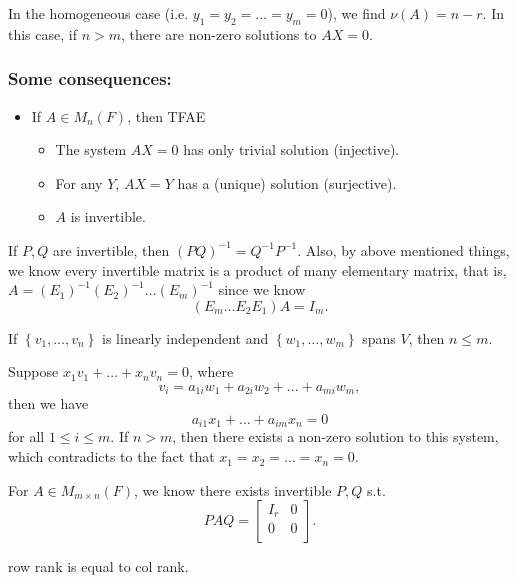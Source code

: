 In the homogeneous case (i.e. \(y_1 = y_2 = \dots = y_m = 0\)), we find \(\nu (A) = n - r\). In this case, if \(n > m\), there are non-zero solutions to \(AX = 0\). 

\subsubsection{Some consequences: }
\begin{itemize}
    \item If \(A \in M_n(F)\), then TFAE 
    \begin{itemize}
        \item The system \(AX=0\) has only trivial solution (injective). 
        \item For any \(Y\), \(AX=Y\) has a (unique) solution (surjective). 
        \item \(A\) is invertible.     
    \end{itemize}
\end{itemize}

If \(P, Q\) are invertible, then \((PQ)^{-1} = Q^{-1} P^{-1}   \). Also, by above mentioned things, we know every invertible matrix is a product of many elementary matrix, that is, \(A = (E_1)^{-1} (E_2)^{-1} \dots (E_m)^{-1}\) since we know 
\[
    (E_m \dots E_2 E_1)A = I_m.
\]   

\begin{prev}
    If \(\left\{ v_1, \dots , v_n \right\} \) is linearly independent and \(\left\{ w_1, \dots , w_m \right\} \) spans \(V\), then \(n \le m\).     
\end{prev}

Suppose \(x_1 v_1 + \dots + x_n v_n = 0\), where 
\[
    v_i = a_{1i}w_1 + a_{2i}w_2 + \dots + a_{mi} w_m,
\] then we have 
\[
    a_{i1} x_1 + \dots + a_{im} x_n = 0
\] for all \(1 \le i \le m\). If \(n > m\), then there exists a non-zero solution to this system, which contradicts to the fact that \(x_1 = x_2 = \dots = x_n = 0\).  

\begin{corollary}
    For \(A \in M_{m \times n}(F)\), we know there exists invertible \(P, Q\) s.t. 
    \[
        PAQ = \begin{bmatrix}
            I_r & 0  \\
            0 & 0  \\
        \end{bmatrix}.
    \]  
\end{corollary}

\begin{corollary}
    row rank is equal to col rank.
\end{corollary}

